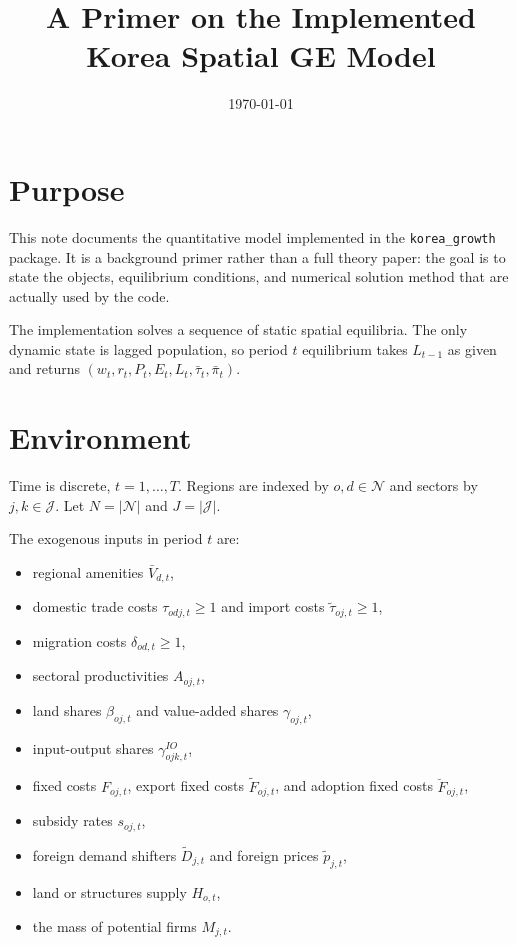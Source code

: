 \documentclass[11pt]{article}
\title{A Primer on the Implemented Korea Spatial GE Model}
\author{}
\date{\today}
\newcommand{\Nreg}{\mathcal{N}}
\newcommand{\Sct}{\mathcal{J}}
\begin{document}
\maketitle

\section{Purpose}
This note documents the quantitative model implemented in the \texttt{korea\_growth}
package. It is a background primer rather than a full theory paper: the goal is to
state the objects, equilibrium conditions, and numerical solution method that are
actually used by the code.

The implementation solves a sequence of static spatial equilibria. The only dynamic
state is lagged population, so period $t$ equilibrium takes $L_{t-1}$ as given and
returns $(w_t,r_t,P_t,E_t,L_t,\bar\tau_t,\bar\pi_t)$.

\section{Environment}
Time is discrete, $t = 1,\dots,T$. Regions are indexed by $o,d \in \Nreg$ and sectors by
$j,k \in \Sct$. Let $N = |\Nreg|$ and $J = |\Sct|$.

The exogenous inputs in period $t$ are:
\begin{itemize}[leftmargin=1.5em]
\item regional amenities $\bar V_{d,t}$,
\item domestic trade costs $\tau_{odj,t} \ge 1$ and import costs $\tilde\tau_{oj,t} \ge 1$,
\item migration costs $\delta_{od,t} \ge 1$,
\item sectoral productivities $A_{oj,t}$,
\item land shares $\beta_{oj,t}$ and value-added shares $\gamma_{oj,t}$,
\item input-output shares $\gamma^{IO}_{ojk,t}$,
\item fixed costs $F_{oj,t}$, export fixed costs $\tilde F_{oj,t}$, and adoption fixed costs
      $\breve F_{oj,t}$,
\item subsidy rates $s_{oj,t}$,
\item foreign demand shifters $\tilde D_{j,t}$ and foreign prices $\tilde p_{j,t}$,
\item land or structures supply $H_{o,t}$,
\item the mass of potential firms $M_{j,t}$.
\end{itemize}
\end{document}
